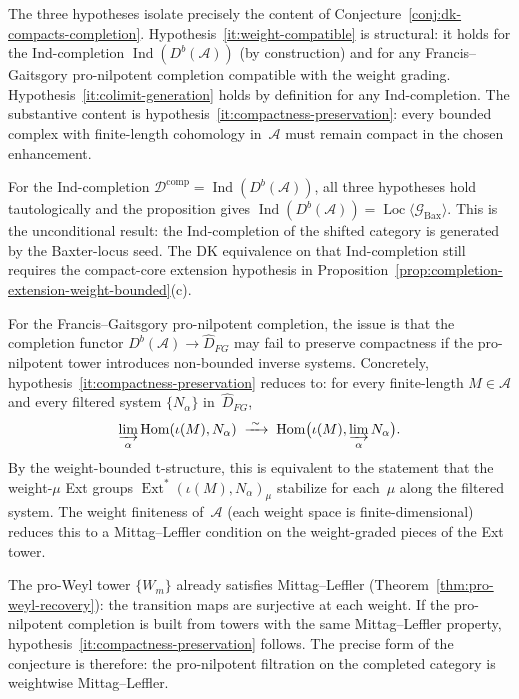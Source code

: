 \begin{remark}
\label{rem:completion-extension-hypotheses}
The three hypotheses isolate precisely the content of
Conjecture~\textup{\ref{conj:dk-compacts-completion}}.
Hypothesis~\ref{it:weight-compatible} is structural: it holds for the
Ind-completion $\operatorname{Ind}(D^b(\mathcal{A}))$
\textup{(}by construction\textup{)} and for any Francis--Gaitsgory
pro-nilpotent completion compatible with the weight grading.
Hypothesis~\ref{it:colimit-generation} holds by definition for any
Ind-completion. The substantive content is
hypothesis~\ref{it:compactness-preservation}: every bounded complex
with finite-length cohomology in~$\mathcal{A}$ must remain compact in
the chosen enhancement.

For the Ind-completion
$\mathcal{D}^{\mathrm{comp}} =
\operatorname{Ind}(D^b(\mathcal{A}))$,
all three hypotheses hold tautologically and the proposition gives
$\operatorname{Ind}(D^b(\mathcal{A})) =
\operatorname{Loc}\langle \mathcal{G}_{\mathrm{Bax}} \rangle$.
This is the unconditional result: the Ind-completion of the shifted
category is generated by the Baxter-locus seed. The DK equivalence on
that Ind-completion still requires the compact-core extension
hypothesis in Proposition~\ref{prop:completion-extension-weight-bounded}(c).

For the Francis--Gaitsgory pro-nilpotent completion, the issue is that
the completion functor $D^b(\mathcal{A}) \to \widehat{D}_{FG}$ may
fail to preserve compactness if the pro-nilpotent tower introduces
non-bounded inverse systems.
Concretely, hypothesis~\ref{it:compactness-preservation} reduces to:
for every finite-length $M \in \mathcal{A}$ and every filtered system
$\{N_\alpha\}$ in~$\widehat{D}_{FG}$,
\[
\varinjlim_\alpha \operatorname{Hom}(\iota(M), N_\alpha)
\;\xrightarrow{\;\sim\;}\;
\operatorname{Hom}\bigl(\iota(M),
\varinjlim_\alpha N_\alpha\bigr).
\]
By the weight-bounded t-structure, this is equivalent to the statement
that the weight-$\mu$ Ext groups
$\operatorname{Ext}^*(\iota(M), N_\alpha)_\mu$
stabilize for each~$\mu$ along the filtered system. The weight
finiteness of~$\mathcal{A}$ \textup{(}each weight space is
finite-dimensional\textup{)} reduces this to a Mittag--Leffler
condition on the weight-graded pieces of the Ext tower.

The pro-Weyl tower $\{W_m\}$ already satisfies Mittag--Leffler
\textup{(}Theorem~\ref{thm:pro-weyl-recovery}\textup{)}: the
transition maps are surjective at each weight. If the pro-nilpotent
completion is built from towers with the same Mittag--Leffler
property, hypothesis~\ref{it:compactness-preservation} follows.
The precise form of the conjecture is therefore: the pro-nilpotent
filtration on the completed category is weightwise Mittag--Leffler.
\end{remark}

